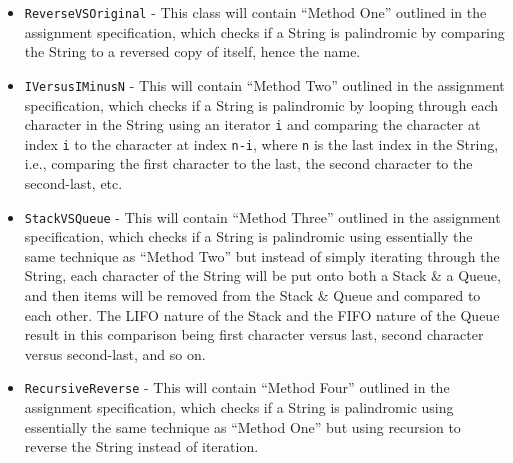 \documentclass[a4paper]{article}
\begin{document}
\begin{itemize}
    \item   \verb|ReverseVSOriginal| - This class will contain ``Method One'' outlined in the assignment specification, which checks if a String is palindromic by comparing the String to a reversed copy of itself, hence the name.
    \item   \verb|IVersusIMinusN| - This will contain ``Method Two'' outlined in the assignment specification, which checks if a String is palindromic by looping through each character in the String using an iterator 
            \verb|i| and comparing the character at index \verb|i| to the character at index \verb|n-i|, where \verb|n| is the last index in the String, i.e., comparing the first character to the last, the second character to the second-last, etc.
    \item   \verb|StackVSQueue| - This will contain ``Method Three'' outlined in the assignment specification, which checks if a String is palindromic using essentially the same technique as ``Method Two'' 
            but instead of simply iterating through the String, each character of the String will be put onto both a Stack \& a Queue, and then items will be removed from the Stack \& Queue and compared to each other. 
            The LIFO nature of the Stack and the FIFO nature of the Queue result in this comparison being first character versus last, second character versus second-last, and so on.
    \item   \verb|RecursiveReverse| - This will contain ``Method Four'' outlined in the assignment specification, which checks if a String is palindromic using essentially the same technique as ``Method One'' 
            but using recursion to reverse the String instead of iteration.
\end{itemize}
\end{document}
